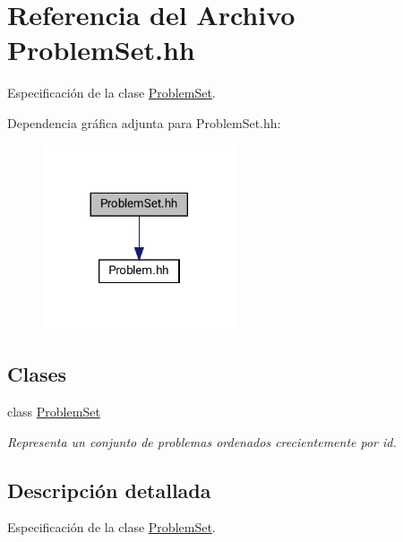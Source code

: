 \hypertarget{_problem_set_8hh}{}\section{Referencia del Archivo Problem\+Set.\+hh}
\label{_problem_set_8hh}


Especificación de la clase \mbox{\hyperlink{class_problem_set}{Problem\+Set}}.  


Dependencia gráfica adjunta para Problem\+Set.\+hh\+:\nopagebreak
\begin{figure}[H]
\begin{center}
\leavevmode
\includegraphics[width=161pt]{_problem_set_8hh__incl}
\end{center}
\end{figure}
\subsection*{Clases}
\begin{DoxyCompactItemize}
\item 
class \mbox{\hyperlink{class_problem_set}{Problem\+Set}}
\begin{DoxyCompactList}\small\item\em Representa un conjunto de problemas ordenados crecientemente por id. \end{DoxyCompactList}\end{DoxyCompactItemize}


\subsection{Descripción detallada}
Especificación de la clase \mbox{\hyperlink{class_problem_set}{Problem\+Set}}. 


